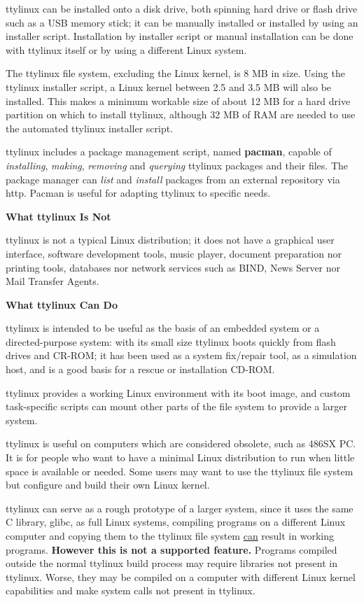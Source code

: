 \documentclass[10pt]{article}
\begin{document}
ttylinux can be installed onto a disk drive, both spinning hard drive or flash
drive such as a USB memory stick; it can be manually installed or installed by
using an installer script. Installation by installer script or manual
installation can be done with ttylinux itself or by using a different Linux
system.

The ttylinux file system, excluding the Linux kernel, is 8 MB in size. Using
the ttylinux installer script, a Linux kernel between 2.5 and 3.5 MB will also
be installed. This makes a minimum workable size of about 12 MB for a hard
drive partition on which to install ttylinux, although 32 MB of RAM are needed
to use the automated ttylinux installer script.

ttylinux includes a package management script, named {\bf pacman}, capable of
{\it installing}, {\it making}, {\it removing} and {\it querying} ttylinux
packages and their files. The package manager can {\it list} and {\it install}
packages from an external repository via http. Pacman is useful for adapting
ttylinux to specific needs.

{\bf What ttylinux Is Not}

ttylinux is not a typical Linux distribution; it does not have a graphical user
interface, software development tools, music player, document preparation nor
printing tools, databases nor network services such as BIND, News Server nor
Mail Transfer Agents.

{\bf What ttylinux Can Do}

ttylinux is intended to be useful as the basis of an embedded system or a
directed-purpose system: with its small size ttylinux boots quickly from flash
drives and CR-ROM; it has been used as a system fix/repair tool, as a
simulation host, and is a good basis for a rescue or installation CD-ROM.

ttylinux provides a working Linux environment with its boot image, and custom
task-specific scripts can mount other parts of the file system to provide a
larger system.

ttylinux is useful on computers which are considered obsolete, such as 486SX
PC. It is for people who want to have a minimal Linux distribution to run when
little space is available or needed. Some users may want to use the ttylinux
file system but configure and build their own Linux kernel.

ttylinux can serve as a rough prototype of a larger system, since it uses the
same C library, glibc, as full Linux systems, compiling programs on a different
Linux computer and copying them to the ttylinux file system \underline{can}
result in working programs. {\bf However this is not a supported feature.}
Programs compiled outside the normal ttylinux build process may require
libraries not present in ttylinux. Worse, they may be compiled on a computer
with different Linux kernel capabilities and make system calls not present in
ttylinux.
\end{document}
